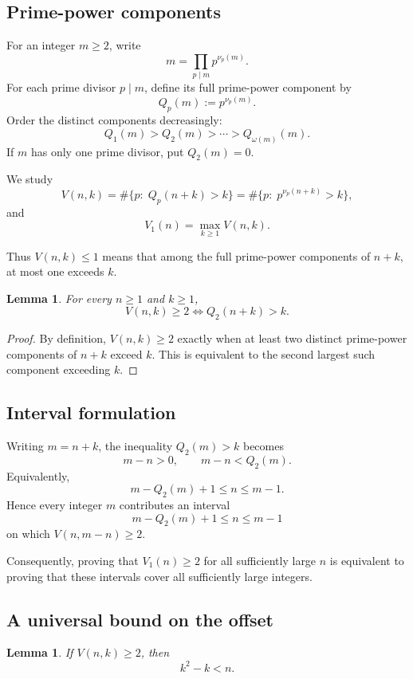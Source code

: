 \documentclass[11pt]{article}
\newtheorem{lemma}[theorem]{Lemma}
\begin{document}
\subsection{Prime-power components}

For an integer \(m\geq2\), write
\[
m=\prod_{p\mid m}p^{\nu_p(m)}.
\]
For each prime divisor \(p\mid m\), define its full prime-power component by
\[
Q_p(m):=p^{\nu_p(m)}.
\]
Order the distinct components decreasingly:
\[
Q_1(m)>Q_2(m)>\cdots>Q_{\omega(m)}(m).
\]
If \(m\) has only one prime divisor, put \(Q_2(m)=0\).

We study
\[
V(n,k)=\#\{p:\;Q_p(n+k)>k\}
       =\#\{p:\;p^{\nu_p(n+k)}>k\},
\]
and
\[
V_1(n)=\max_{k\geq1}V(n,k).
\]

Thus \(V(n,k)\leq1\) means that among the full prime-power components of
\(n+k\), at most one exceeds \(k\).

\begin{lemma}\label{lem:q2}
For every \(n\geq1\) and \(k\geq1\),
\[
V(n,k)\geq2
\iff
Q_2(n+k)>k.
\]
\end{lemma}

\begin{proof}
By definition, \(V(n,k)\geq2\) exactly when at least two distinct
prime-power components of \(n+k\) exceed \(k\).  This is equivalent to the
second largest such component exceeding \(k\).
\end{proof}

\subsection{Interval formulation}

Writing \(m=n+k\), the inequality \(Q_2(m)>k\) becomes
\[
m-n>0,\qquad m-n<Q_2(m).
\]
Equivalently,
\[
m-Q_2(m)+1\leq n\leq m-1.
\]
Hence every integer \(m\) contributes an interval
\[
\boxed{
m-Q_2(m)+1\leq n\leq m-1
}
\tag{1}\label{eq:interval}
\]
on which \(V(n,m-n)\geq2\).

Consequently, proving that \(V_1(n)\geq2\) for all sufficiently large \(n\)
is equivalent to proving that these intervals cover all sufficiently large
integers.

\subsection{A universal bound on the offset}

\begin{lemma}\label{lem:kbound}
If \(V(n,k)\geq2\), then
\[
k^2-k<n.
\]
\end{lemma}
\end{document}
